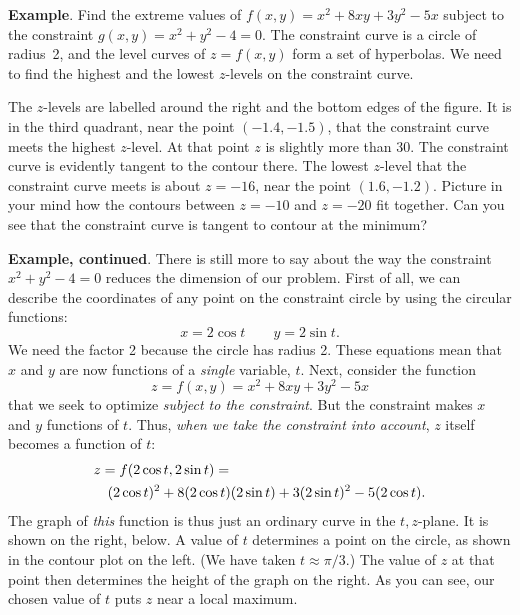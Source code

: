 {{{{\medskip



{\bf Example}.  Find the extreme values of $f(x, y) = x^2 + 8 x y + 3 y^2 - 5 x$ subject to the constraint $g(x, y) = x^2 + y^2 - 4 = 0$.  The constraint curve is a circle of radius~2, and the level curves of $z = f(x, y)$ form a set of hyperbolas.  We need to find the highest and the lowest $z$-levels on the constraint curve.  

\vspace{7pt}
\vspace{165pt}

The $z$-levels are labelled around the right and the bottom edges of the figure.  
It is in the third quadrant, near the point $(-1.4, -1.5)$, that the constraint curve meets the highest $z$-level. At that point $z$ is slightly more than 30.  The constraint curve is evidently tangent to the contour there.  The lowest $z$-level that the constraint curve meets is about $z = -16$, near the point $(1.6, -1.2)$.  Picture in your mind how the contours between $z = -10$ and $z = -20$ fit together.  Can you see that the constraint curve is tangent to contour at the minimum?  




{\bf Example, continued}.  
There is still more to say about the way the constraint $x^2 + y^2 - 4 = 0$ reduces the dimension of our problem.  First of all, we can describe the coordinates of any point on the constraint circle by using the circular functions:
        \[
x = 2 \cos{t} \qquad y = 2 \sin{t}.
\]
We need the factor 2 because the circle has radius 2.  These equations mean that $x$ and $y$ are now functions of a {\em single\/} variable, $t$.  Next, consider the function 
        \[
z = f(x, y) = x^2 + 8 x y + 3 y^2 - 5x
\]
that we seek to optimize {\em subject to the constraint}.  
But the constraint makes $x$ and $y$ functions of $t$.  Thus, {\em when we take the constraint into account}, $z$ itself becomes a function of $t$:
        \begin{eqnarray*}
        \lefteqn{z = f(2 \cos{t}, 2 \sin{t}) = }        \\
                && ( 2 \cos{t} )^2 + 8 ( 2\cos{t} ) ( 2\sin{t} ) +
                3 ( 2\sin{t} )^2 - 5 ( 2\cos{t} ).
        \end{eqnarray*} 
The graph of {\em this\/} function is thus just an ordinary curve in the $t, z$-plane.  It is shown on the right, below.  A value of $t$ determines a point on the circle, as shown in the contour plot on the left.  (We have taken $t \approx \pi/3$.)  The value of $z$ at that point then determines the height of the graph on the right.  As you can see, our chosen value of $t$ puts $z$ near a local maximum.

}}}}

